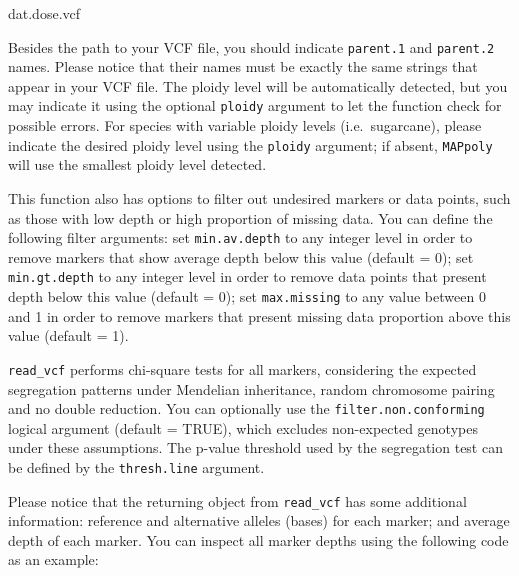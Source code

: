 \documentclass[
]{article}
\newenvironment{Shaded}{}{}
\newcommand{\NormalTok}[1]{#1}
\begin{document}
\begin{Shaded}
\begin{Highlighting}[]
\NormalTok{dat.dose.vcf}
\end{Highlighting}
\end{Shaded}

Besides the path to your VCF file, you should indicate \texttt{parent.1}
and \texttt{parent.2} names. Please notice that their names must be
exactly the same strings that appear in your VCF file. The ploidy level
will be automatically detected, but you may indicate it using the
optional \texttt{ploidy} argument to let the function check for possible
errors. For species with variable ploidy levels (i.e.~sugarcane), please
indicate the desired ploidy level using the \texttt{ploidy} argument; if
absent, \texttt{MAPpoly} will use the smallest ploidy level detected.

This function also has options to filter out undesired markers or data
points, such as those with low depth or high proportion of missing data.
You can define the following filter arguments: set \texttt{min.av.depth}
to any integer level in order to remove markers that show average depth
below this value (default = 0); set \texttt{min.gt.depth} to any integer
level in order to remove data points that present depth below this value
(default = 0); set \texttt{max.missing} to any value between 0 and 1 in
order to remove markers that present missing data proportion above this
value (default = 1).

\texttt{read\_vcf} performs chi-square tests for all markers,
considering the expected segregation patterns under Mendelian
inheritance, random chromosome pairing and no double reduction. You can
optionally use the \texttt{filter.non.conforming} logical argument
(default = TRUE), which excludes non-expected genotypes under these
assumptions. The p-value threshold used by the segregation test can be
defined by the \texttt{thresh.line} argument.

Please notice that the returning object from \texttt{read\_vcf} has some
additional information: reference and alternative alleles (bases) for
each marker; and average depth of each marker. You can inspect all
marker depths using the following code as an example:
\end{document}
